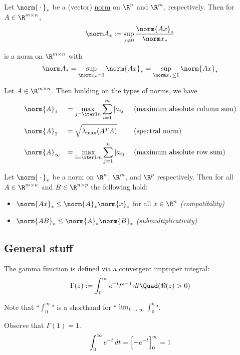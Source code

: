 \label{bad47a4}

Let $\norm{\,\cdot\,}_*$ be a (vector) \href{e0fff96}{norm} on $\R^n$ and
$\R^m$, respectively. Then for $A\in\R^{m\times n}$,
$$
  \norm A_*:=\sup_{x\neq0}\frac{\norm{Ax}_*}{\norm x_*}
$$

is a norm on $\R^{m\times n}$ with
$$
  \norm A_*=\sup_{\norm x_*=1}\norm{Ax}_*=\sup_{\norm x_*\leq1}\norm{Ax}_*
$$

\Proposition{}\label{ab2107f}

Let $A\in\R^{m\times n}$. Then building on the \href{ef0996f}{types of norms},
we have
$$
  \begin{array}{l l l}
    \norm{A}_1      & = \displaystyle\max_{j=\iter1n}\sum_{i=1}^m|a_{ij}| & \text{(maximum absolute column sum)} \\[1.5em]
    \norm{A}_2      & = \displaystyle\sqrt{\lambda_{\max}(A^TA)}          & \text{(spectral norm)}               \\[1em]
    \norm{A}_\infty & = \displaystyle\max_{i=\iter1m}\sum_{j=1}^n|a_{ij}| & \text{(maximum absolute row sum)}
  \end{array}
$$

\Proposition{}\label{dd47a09}

Let $\norm{\,\cdot\,}_*$ be a norm on $\R^n$, $\R^m$, and $\R^p$ respectively.
Then for all $A\in\R^{m\times n}$ and $B\in\R^{n\times p}$ the following hold:
\begin{itemize}
  \def\nm#1{\norm{#1}_*}
  \item $\nm{Ax}\leq\nm A\nm x$ for all $x\in\R^n$ \quad \textit{(compatibility)}
  \item $\nm{AB}\leq\nm A\nm B$ \quad \textit{(submultiplicativity)}
\end{itemize}

\subsection{General stuff}\label{f578ae7}

\label{ce1fa3f}

The gamma function is defined via a convergent improper integral:
$$
  \Gamma(z):=\int_0^\infty e^{-t}t^{z-1}\,dt\Quad(\Re(z)>0)
$$

Note that ``$\displaystyle\int_0^\infty$" is a shorthand for
``$\displaystyle\lim_{k\to\infty}\int_0^k$".

Observe that $\Gamma(1)=1$.
$$
  \int_0^\infty e^{-t}\,dt=\Bigl[-e^{-t}\Bigr]_0^\infty=1
$$

